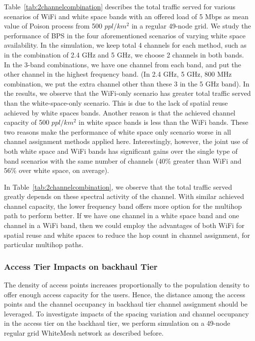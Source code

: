 Table~\ref{tab:2channelcombination} describes the total traffic served 
for various scenarios of WiFi and white space bands with an offered load 
of 5 Mbps as mean value of Poison process from 500 $ppl/km^2$ in a regular 49-node grid. 
We study the performance of BPS in the four aforementioned scenarios of varying 
white space availability. In the simulation, we keep total 4 channels for each
method, such as in the combination of 2.4 GHz and 5 GHz, we choose 2 channels in both 
bands. In the 3-band combinations, we have one channel from each band, and put the 
other channel in the highest frequency band. (In 2.4 GHz, 5 GHz, 800 MHz combination, 
we put the extra channel other than these $3$ in the 5 GHz band). 
In the results, we observe that the WiFi-only scenario has greater total traffic served 
than the white-space-only scenario. This is due to the lack of spatial reuse achieved 
by white spaces bands. 
Another reason is that the achieved channel capacity of 500 $ppl/km^2$ in white 
space bands is less than the WiFi bands. These two reasons make the performance of 
white space only scenario worse in all channel assignment methods applied here.
Interestingly, however, the joint use of both white space and WiFi bands has 
significant gains over the single type of band scenarios with the same number of 
channels (40\% greater than WiFi and 56\% over white space, on average). 



In Table~\ref{tab:2channelcombination}, we observe that the total traffic served greatly depends on these spectral activity of the channel.
With similar achieved channel capacity, the lower frequency band
offers more option for the multihop path to perform better. 
If we have one channel in a white space band and one channel in a WiFi band, then 
we could employ the advantages of both WiFi for spatial reuse and white spaces to 
reduce the hop count in channel assignment, for particular multihop paths. 

\subsubsection{Access Tier Impacts on backhaul Tier}

The density of access points increases proportionally to the population 
density to offer enough access capacity for the users. 
Hence, the distance among the access points and the channel 
occupancy in backhaul tier channel assignment should be leveraged.
To investigate impacts of the spacing variation and channel occupancy in the access tier 
on the backhaul tier, we perform simulation on a 49-node regular grid WhiteMesh network as
described before. 

